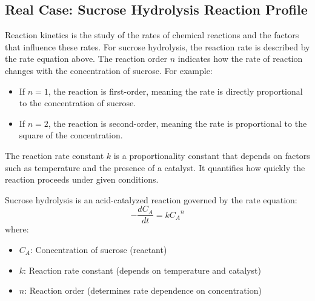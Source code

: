\documentclass[10pt]{article}
\begin{document}
\subsection{Real Case: Sucrose Hydrolysis Reaction Profile}
Reaction kinetics is the study of the rates of chemical reactions and the factors that influence these rates. For sucrose hydrolysis, the reaction rate is described by the rate equation above. The reaction order \( n \) indicates how the rate of reaction changes with the concentration of sucrose. For example:
\begin{itemize}
    \item If \( n = 1 \), the reaction is first-order, meaning the rate is directly proportional to the concentration of sucrose.
    \item If \( n = 2 \), the reaction is second-order, meaning the rate is proportional to the square of the concentration.
\end{itemize}
The reaction rate constant \( k \) is a proportionality constant that depends on factors such as temperature and the presence of a catalyst. It quantifies how quickly the reaction proceeds under given conditions.

Sucrose hydrolysis is an acid-catalyzed reaction governed by the rate equation:
\begin{equation}
    -\frac{dC_A}{dt} = k{C_A}^n
\end{equation}
where:
\begin{itemize}
    \item \( C_A \): Concentration of sucrose (reactant)
    \item \( k \): Reaction rate constant (depends on temperature and catalyst)
    \item \( n \): Reaction order (determines rate dependence on concentration)
\end{itemize}
\end{document}
